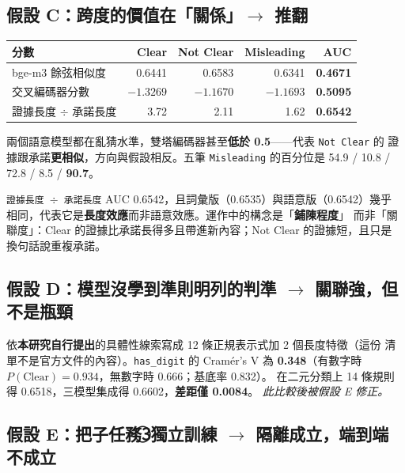 \documentclass[11pt,a4paper]{ctexart}
\newcommand{\fn}[1]{\texttt{#1}}
\begin{document}
\subsection*{假設 C：跨度的價值在「關係」$\to$ 推翻}

\begin{table}[h]
\centering\small
\begin{tabular}{@{}lrrrr@{}}
\toprule
分數 & Clear & Not Clear & Misleading & AUC \\
\midrule
bge-m3 餘弦相似度 & 0.6441 & 0.6583 & 0.6341 & \textbf{0.4671} \\
交叉編碼器分數 & $-1.3269$ & $-1.1670$ & $-1.1693$ & \textbf{0.5095} \\
證據長度 $\div$ 承諾長度 & 3.72 & 2.11 & 1.62 & \textbf{0.6542} \\
\bottomrule
\end{tabular}
\end{table}

兩個語意模型都在亂猜水準，雙塔編碼器甚至\textbf{低於 0.5}——代表 \fn{Not Clear} 的
證據跟承諾\textbf{更相似}，方向與假設相反。五筆 \fn{Misleading} 的百分位是
54.9 / 10.8 / 72.8 / 8.5 / \textbf{90.7}。

\begin{tcolorbox}[colback=green!5, colframe=green!45, title=存活的發現]
\fn{證據長度 $\div$ 承諾長度} AUC 0.6542，且詞彙版（0.6535）與語意版（0.6542）幾乎
相同，代表它是\textbf{長度效應}而非語意效應。運作中的構念是「\textbf{鋪陳程度}」
而非「關聯度」：Clear 的證據比承諾長得多且帶進新內容；Not Clear 的證據短，且只是
換句話說重複承諾。
\end{tcolorbox}

\subsection*{假設 D：模型沒學到準則明列的判準 $\to$ 關聯強，但不是瓶頸}

依\textbf{本研究自行提出}的具體性線索寫成 12 條正規表示式加 2 個長度特徵（這份
清單不是官方文件的內容）。\fn{has\_digit} 的 Cramér's V 為
\textbf{0.348}（有數字時 $P(\text{Clear})=0.934$，無數字時 0.666；基底率 0.832）。
在二元分類上 14 條規則得 0.6518，三模型集成得 0.6602，\textbf{差距僅 0.0084}。
\textit{此比較後被假設 E 修正。}

\subsection*{假設 E：把子任務\textcircled{3}獨立訓練 $\to$ 隔離成立，端到端不成立}
\end{document}
